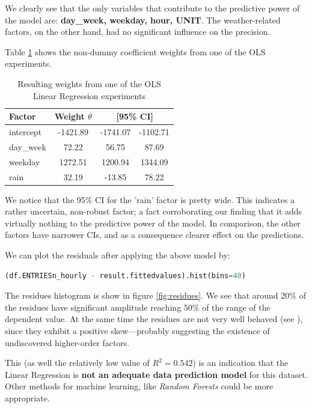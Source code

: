 \documentclass{article}
\begin{document}
We clearly see that the only variables that contribute to the predictive power of the model are: \textbf{day\_week, weekday, hour, UNIT}. The weather-related factors, on the other hand, had no significant influence on the precision.

Table \ref{tab:ols_results} shows the non-dummy coefficient weights from one of the OLS experiments.

\begin{table}[ht]
\centering
\begin{tabular}{l|c|c|c}
\hline
Factor & Weight $\theta$ & \multicolumn{2}{|c}{[95\% CI]}\\
\hline
intercept &  -1421.89 & -1741.07 & -1102.71\\
day\_week &  72.22 &   56.75 & 87.69 \\
weekday &  1272.51 &  1200.94 &  1344.09 \\
rain  & 32.19 & -13.85 &  78.22\\
\hline
\end{tabular}
\caption{Resulting weights from one of the OLS Linear Regression experiments}
\label{tab:ols_results}
\end{table}

We notice that the 95\% CI for the 'rain' factor is pretty wide. This indicates a rather uncertain, non-robust factor; a fact corroborating our finding that it adds virtually nothing to the predictive power of the model. In comparison, the other factors have narrower CIs, and as a consequence clearer effect on the predictions.

We can plot the residuals after applying the above model by:
\begin{lstlisting}[language=Python]
(df.ENTRIESn_hourly - result.fittedvalues).hist(bins=40)
\end{lstlisting}

The residues histogram is show in figure \ref{fig:residues}. We see that around 20\% of the residues have significant amplitude reaching 50\% of the range of the dependent value. At the same time the residues are not very well behaved (see \cite{good_residues}), since they exhibit a positive skew---probably suggesting the existence of undiscovered higher-order factors.

This (as well the relatively low value of $R^2=0.542$) is an indication that the Linear Regression is \textbf{not an adequate data prediction model} for this dataset. Other methods for machine learning, like \textit{Random Forests} could be more appropriate.
\end{document}
